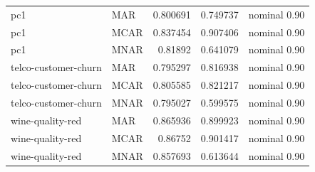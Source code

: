 \begin{table}[ht]
\begin{tabular}{llrrl}
 pc1                  & MAR         &                    0.800691    &                         0.749737 & nominal 0.90              \\
 pc1                  & MCAR        &                    0.837454    &                         0.907406 & nominal 0.90              \\
 pc1                  & MNAR        &                    0.81892     &                         0.641079 & nominal 0.90              \\
 telco-customer-churn & MAR         &                    0.795297    &                         0.816938 & nominal 0.90              \\
 telco-customer-churn & MCAR        &                    0.805585    &                         0.821217 & nominal 0.90              \\
 telco-customer-churn & MNAR        &                    0.795027    &                         0.599575 & nominal 0.90              \\
 wine-quality-red     & MAR         &                    0.865936    &                         0.899923 & nominal 0.90              \\
 wine-quality-red     & MCAR        &                    0.86752     &                         0.901417 & nominal 0.90              \\
 wine-quality-red     & MNAR        &                    0.857693    &                         0.613644 & nominal 0.90              \\
\hline
\end{tabular}
\end{table}
